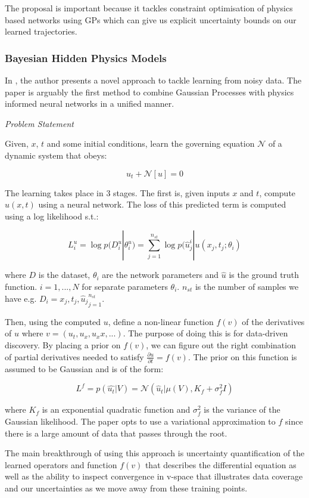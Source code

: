 \documentclass{article}
\begin{document}
The proposal is important because it tackles constraint optimisation of physics based networks using GPs which can give us explicit uncertainty bounds on our learned trajectories.


\subsubsection{Bayesian Hidden Physics Models}

In \cite{atkinson_bayesian_2020}, the author presents a novel approach to tackle learning from noisy data. The paper is arguably the first method to combine Gaussian Processes with physics informed neural networks in a unified manner.

\textit{Problem Statement}

Given, $x$, $t$ and some initial conditions, learn the governing equation $\mathcal{N}$ of a dynamic system that obeys:

$$ u_t + \mathcal{N}[u] = 0 $$

The learning takes place in 3 stages. The first is, given inputs $x$ and $t$, compute $u(x,t)$ using a neural network. The loss of this predicted term is computed using a log likelihood s.t.:

$$ L_i^u = \log p(D_i^u|\theta_i^u) = \sum_{j=1}^{n_{st}} \log p(\hat{u}_j^{i} | u(x_j,t_j;\theta_i) $$

where $D$ is the dataset, $\theta_i$ are the network parameters and $\hat{u}$ is the ground truth function. $i = 1,...,N$ for separate parameters $\theta_i$. $n_{st}$ is the number of samples we have e.g. $ D_i = {x_j,t_j,\hat{u}_j}_{j=1}^{n_{st}} $.

Then, using the computed $u$, define a non-linear function $f(v)$ of the derivatives of $u$ where $v = (u_t,u_x,u_xx,...)$. The purpose of doing this is for data-driven discovery. By placing a prior on $f(v)$, we can figure out the right combination of partial derivatives needed to satisfy $\frac{\partial u}{\partial t} = f(v) $. The prior on this function is assumed to be Gaussian and is of the form:

$$ L^f = p(\hat{u_t}|V) = \mathcal{N} (\hat{u}_t|\mu(V),K_f +\sigma_f^2 I) $$

where $K_f$ is an exponential quadratic function and $\sigma_f^2$ is the variance of the Gaussian likelihood.
The paper opts to use a variational approximation to $f$ since there is a large amount of data that passes through the root.

The main breakthrough of using this approach is uncertainty quantification of the learned operators and function $f(v)$ that describes the differential equation as well as the ability to inspect convergence in v-space that illustrates data coverage and our uncertainties as we move away from these training points.
\end{document}
